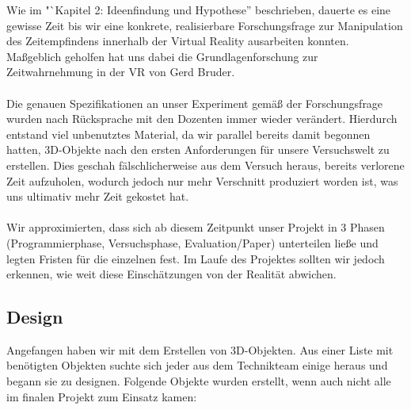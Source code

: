 \documentclass{Bericht}
\begin{document}
		Wie im "`Kapitel 2: Ideenfindung und Hypothese'' beschrieben, dauerte es eine gewisse Zeit bis wir eine konkrete, realisierbare Forschungsfrage zur Manipulation des Zeitempfindens innerhalb der Virtual Reality ausarbeiten konnten. Maßgeblich geholfen hat uns dabei die Grundlagenforschung zur Zeitwahrnehmung in der VR von Gerd Bruder.\\
\\
		Die genauen Spezifikationen an unser Experiment gemäß der Forschungsfrage wurden nach Rücksprache mit den Dozenten immer wieder verändert. Hierdurch entstand viel unbenutztes Material, da wir parallel bereits damit begonnen hatten, 3D-Objekte nach den ersten Anforderungen für unsere Versuchswelt zu erstellen. Dies geschah fälschlicherweise aus dem Versuch heraus, bereits verlorene Zeit aufzuholen, wodurch jedoch nur mehr Verschnitt produziert worden ist, was uns ultimativ mehr Zeit gekostet hat.\\
\\
		Wir approximierten, dass sich ab diesem Zeitpunkt unser Projekt in 3 Phasen (Programmierphase, Versuchsphase, Evaluation/Paper) unterteilen ließe und legten Fristen für die einzelnen fest. Im Laufe des Projektes sollten wir jedoch erkennen, wie weit diese Einschätzungen von der Realität abwichen.

	\subsection{Design} %
		Angefangen haben wir mit dem Erstellen von 3D-Objekten. Aus einer Liste mit benötigten Objekten suchte sich jeder aus dem Technikteam einige heraus und begann sie zu designen. Folgende Objekte wurden erstellt, wenn auch nicht alle im finalen Projekt zum Einsatz kamen:
\end{document}
